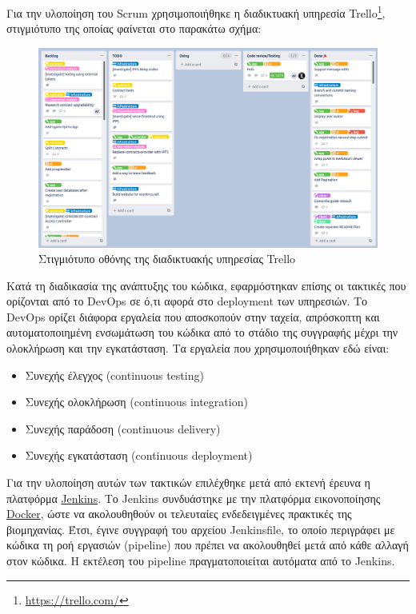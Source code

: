 Για την υλοποίηση του Scrum χρησιμοποιήθηκε η διαδικτυακή υπηρεσία Trello\footnote{\url{https://trello.com/}}, στιγμιότυπο της οποίας φαίνεται στο παρακάτω σχήμα:

\vspace{.25\baselineskip}

\begin{figure}[H]
    \centering
    \includegraphics[width=\textwidth]{assets/figures/chapter-4/4.1.implementation-methodology-kanban}
    \caption{Στιγμιότυπο οθόνης της διαδικτυακής υπηρεσίας Trello}
    \label{figure:4.1.implementation-methodology-kanban}
\end{figure}

Κατά τη διαδικασία της ανάπτυξης του κώδικα, εφαρμόστηκαν επίσης οι τακτικές που ορίζονται από το DevOps σε ό,τι αφορά στο deployment των υπηρεσιών. Το DevOps ορίζει διάφορα εργαλεία που αποσκοπούν στην ταχεία, απρόσκοπτη και αυτοματοποιημένη ενσωμάτωση του κώδικα από το στάδιο της συγγραφής μέχρι την ολοκλήρωση και την εγκατάσταση. Τα εργαλεία που χρησιμοποιήθηκαν εδώ είναι:

\begin{itemize}
    \item Συνεχής έλεγχος (continuous testing)
    \item Συνεχής ολοκλήρωση (continuous integration)
    \item Συνεχής παράδοση (continuous delivery)
    \item Συνεχής εγκατάσταση (continuous deployment)
\end{itemize}

Για την υλοποίηση αυτών των τακτικών επιλέχθηκε μετά από εκτενή έρευνα η πλατφόρμα \hyperref[subsection:4-2-1-3-jenkins]{Jenkins}. Το Jenkins συνδυάστηκε με την πλατφόρμα εικονοποίησης \hyperref[subsection:4-2-1-2-docker]{Docker}, ώστε να ακολουθηθούν οι τελευταίες ενδεδειγμένες πρακτικές της βιομηχανίας. Έτσι, έγινε συγγραφή του αρχείου Jenkinsfile, το οποίο περιγράφει με κώδικα τη ροή εργασιών (pipeline) που πρέπει να ακολουθηθεί μετά από κάθε αλλαγή στον κώδικα. Η εκτέλεση του pipeline πραγματοποιείται αυτόματα από το Jenkins.

